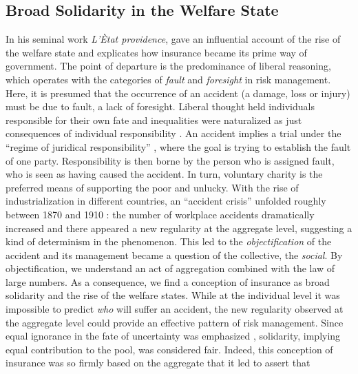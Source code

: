 \documentclass[11pt]{article} %
\makeatletter
\newcommand*{\cf}{cf.\@\xspace}
\makeatother
\begin{document}
\subsection{Broad Solidarity in the Welfare State}
In his seminal work \textit{L'Ètat providence}, \citet{ewald_letat_1986} gave an influential account of the rise of the welfare state and explicates how insurance became its prime way of government. The point of departure is the predominance of liberal reasoning, which operates with the categories of \textit{fault} and \textit{foresight} in risk management. Here, it is presumed that the occurrence of an accident (a damage, loss or injury) must be due to fault, a lack of foresight. Liberal thought held individuals responsible for their own fate and inequalities were naturalized as just consequences of individual responsibility \citep{landes2013normative}. An accident implies a trial under the “regime of juridical responsibility” \citep{ewald_letat_1986}, where the goal is trying to establish the fault of one party.
Responsibility is then borne by the person who is assigned fault, who is seen as having caused the accident. In turn, voluntary charity is the preferred means of supporting the poor and unlucky. 
With the rise of industrialization in different countries, an ``accident crisis'' unfolded roughly between 1870 and 1910 \citep{krippner2023unmasked}: the number of workplace accidents dramatically increased and there appeared a new regularity at the aggregate level, suggesting a kind of determinism in the phenomenon. This led to the \textit{objectification} of the accident and its management became a question of the collective, the \textit{social}. By objectification, we understand an act of aggregation combined with the law of large numbers. As a consequence, we find a conception of insurance as broad solidarity and the rise of the welfare states. While at the individual level it was impossible to predict \textit{who} will suffer an accident, the new regularity observed at the aggregate level could provide an effective pattern of risk management. Since equal ignorance in the fate of uncertainty was emphasized \citep{ewald_letat_1986}, 
solidarity, implying equal contribution to the pool, was considered fair. Indeed, this conception of insurance was so firmly based on the aggregate that it led \citet{ewald1991insurance} to assert that 
\end{document}
